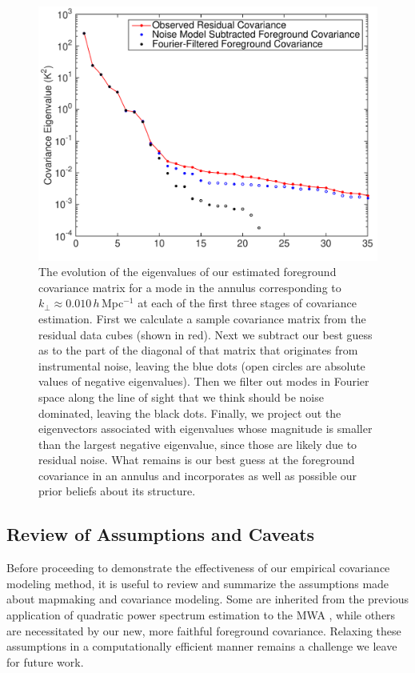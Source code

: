 \begin{figure}[]  
	\centering 
	\includegraphics[width=.48\textwidth]{chap4_empirical_covariance/eigenvalue_stages.pdf}
	\caption[The evolution of the eigenvalues of our estimated foreground covariance matrix for a mode in the annulus corresponding to $k_\perp \approx 0.010$\,$h$\,Mpc$^{-1}$.]{The evolution of the eigenvalues of our estimated foreground covariance matrix for a mode in the annulus corresponding to $k_\perp \approx 0.010$\,$h$\,Mpc$^{-1}$ at each of the first three stages of covariance estimation. First we calculate a sample covariance matrix from the residual data cubes (shown in red). Next we subtract our best guess as to the part of the diagonal of that matrix that originates from instrumental noise, leaving the blue dots (open circles are absolute values of negative eigenvalues). Then we filter out modes in Fourier space along the line of sight that we think should be noise dominated, leaving the black dots. Finally, we project out the eigenvectors associated with eigenvalues whose magnitude is smaller than the largest negative eigenvalue, since those are likely due to residual noise. What remains is our best guess at the foreground covariance in an annulus and incorporates as well as possible our prior beliefs about its structure.}
	\label{fig:cov_steps}
\end{figure}  


\subsection{Review of Assumptions and Caveats} \label{sec:caveats}

Before proceeding to demonstrate the effectiveness of our empirical covariance modeling method, it is useful to review and summarize the assumptions made about mapmaking and covariance modeling. Some are inherited from the previous application of quadratic power spectrum estimation to the MWA \citep{X13}, while others are necessitated by our new, more faithful foreground covariance. Relaxing these assumptions in a computationally efficient manner remains a challenge we leave for future work.

